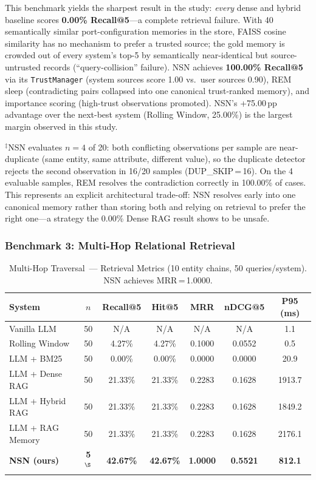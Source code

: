 \documentclass[conference]{IEEEtran}
\begin{document}
This benchmark yields the sharpest result in the study: \emph{every} dense
and hybrid baseline scores \textbf{0.00\% Recall@5}---a complete retrieval
failure.  With 40 semantically similar port-configuration memories in the
store, FAISS cosine similarity has no mechanism to prefer a trusted source;
the gold memory is crowded out of every system's top-5 by semantically
near-identical but source-untrusted records (``query-collision'' failure).
NSN achieves \textbf{100.00\% Recall@5} via its
\texttt{TrustManager} (system sources score 1.00 vs.\ user sources 0.90),
REM sleep (contradicting pairs collapsed into one canonical trust-ranked
memory), and importance scoring (high-trust observations promoted).
NSN's +75.00\,pp advantage over the next-best system (Rolling Window, 25.00\%)
is the largest margin observed in this study.

$^\ddagger$NSN evaluates $n{=}4$ of 20: both conflicting observations per
sample are near-duplicate (same entity, same attribute, different value),
so the duplicate detector rejects the second observation in 16/20 samples
(DUP\_SKIP\,=\,16).  On the 4 evaluable samples, REM resolves the
contradiction correctly in 100.00\% of cases.  This represents an explicit
architectural trade-off: NSN resolves early into one canonical memory rather
than storing both and relying on retrieval to prefer the right one---a strategy
the 0.00\% Dense RAG result shows to be unsafe.

\subsubsection{Benchmark 3: Multi-Hop Relational Retrieval}

\begin{table}[!t]
\caption{Multi-Hop Traversal~--- Retrieval Metrics (10 entity chains, 50 queries/system). NSN achieves MRR\,=\,1.0000.}
\label{tab:multihop}
\centering\scriptsize
\begin{tabular}{@{}lcccccc@{}}
\toprule
\textbf{System} & $n$ & \textbf{Recall@5} & \textbf{Hit@5}
  & \textbf{MRR} & \textbf{nDCG@5} & \textbf{P95 (ms)} \\
\midrule
Vanilla LLM      & 50 & N/A     & N/A     & N/A    & N/A    & 1.1    \\
Rolling Window   & 50 & 4.27\%  & 4.27\%  & 0.1000 & 0.0552 & 0.5    \\
LLM + BM25       & 50 & 0.00\%  & 0.00\%  & 0.0000 & 0.0000 & 20.9   \\
LLM + Dense RAG  & 50 & 21.33\% & 21.33\% & 0.2283 & 0.1628 & 1913.7 \\
LLM + Hybrid RAG & 50 & 21.33\% & 21.33\% & 0.2283 & 0.1628 & 1849.2 \\
LLM + RAG Memory & 50 & 21.33\% & 21.33\% & 0.2283 & 0.1628 & 2176.1 \\
\textbf{NSN (ours)} & \textbf{5}$^\S$
  & \textbf{42.67\%} & \textbf{42.67\%} & \textbf{1.0000} & \textbf{0.5521} & \textbf{812.1} \\
\bottomrule
\end{tabular}
\end{table}
\end{document}
